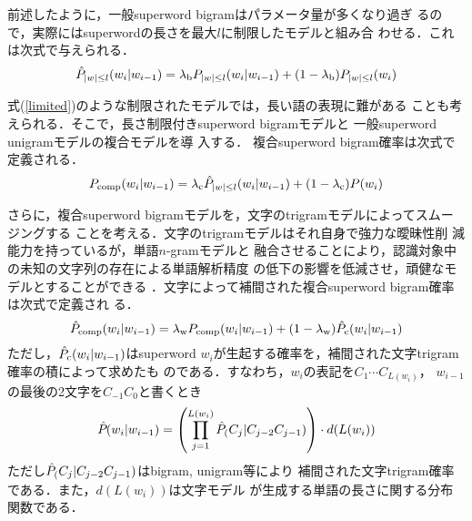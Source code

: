 前述したように，一般superword bigramはパラメータ量が多くなり過ぎ
るので，実際にはsuperwordの長さを最大$l$に制限したモデルと組み合
わせる．これは次式で与えられる．
\begin{equation}
\hat{P}_{|w|\leq l}(w_i|w_{i-1})=
\lambda_{\mbox{\scriptsize b}}P_{|w|\leq l}(w_i|w_{i-1})
+(1-\lambda_{\mbox{\scriptsize b}})P_{|w|\leq l}(w_i)
\label{limited}
\end{equation}

式(\ref{limited})のような制限されたモデルでは，長い語の表現に難がある
ことも考えられる．そこで，長さ制限付きsuperword bigramモデルと
一般superword unigramモデルの複合モデルを導\break
入する．
複合superword bigram確率は次式で定義される．
\begin{equation}
P_{\mbox{\scriptsize comp}}(w_i|w_{i-1})=
\lambda_{\mbox{\scriptsize c}}\hat{P}_{|w|\leq l}(w_i|w_{i-1})
+(1-\lambda_{\mbox{\scriptsize c}})P(w_i)
\label{composite}
\end{equation}

さらに，複合superword bigramモデルを，文字のtrigramモデルによってスムー
ジングする\break
ことを考える．文字のtrigramモデルはそれ自身で強力な曖昧性削
減能力を持っているが\cite{mori96}，単語$n$-gramモデルと
融合させることにより，認識対象中の未知の文字列の存在による単語解析精度
の低下の影響を低減させ，頑健なモデルとすることができる\cite{mori96a}
．文字によって補間された複合superword bigram確率は次式で定義され
る．
\begin{equation}
\hat{P}_{\mbox{\scriptsize comp}}(w_i|w_{i-1})=
\lambda_{\mbox{\scriptsize w}}P_{\mbox{\scriptsize comp}}(w_i|w_{i-1})
+(1-\lambda_{\mbox{\scriptsize w}})\hat{P}_{\mbox{\scriptsize c}}(w_i|w_{i-1})
\label{charint}
\end{equation}
ただし，\(\hat{P}_{\mbox{\scriptsize c}}(w_i|w_{i-1})\)はsuperword
\(w_i\)が生起する確率を，補間された文字trigram確率の積によって求めたも
のである．すなわち，\(w_i\)の表記を\(C_1\cdots C_{L(w_i)}\)，
\(w_{i-1}\)の最後の2文字を\(C_{-1}C_0\)と書くとき
\begin{equation}
\hat{P}_{\scr{c}}(w_i|w_{i-1})=
\left(\prod_{j=1}^{L(w_i)}\hat{P}_\scr{c}(C_j|C_{j-2}C_{j-1})\right)
\cdot d(L(w_i))
\label{charmodel}
\end{equation}
ただし\(\hat{P}_\scr{c}(C_j|C_{j-2}C_{j-1})\)はbigram, unigram等により
補間された文字trigram確率である．また，\(d(L(w_i))\)は文字モデル
が生成する単語の長さに関する分布関数である．

